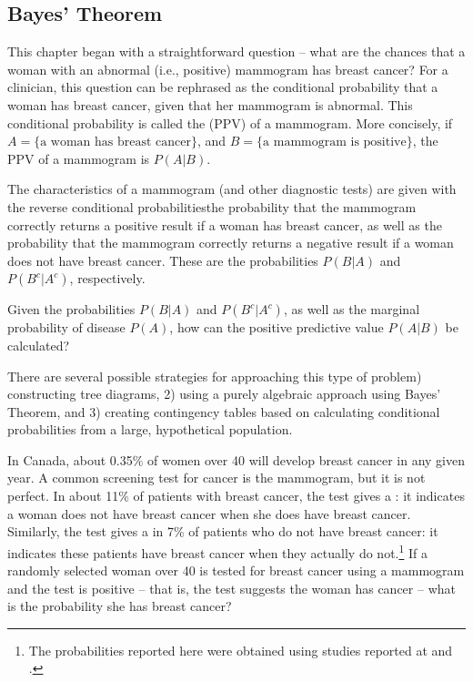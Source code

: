 \subsection{Bayes' Theorem}
\label{bayesTheoremSubsection}


This chapter began with a straightforward question -- what are the chances that a woman with an abnormal (i.e., positive) mammogram has breast cancer?  For a clinician, this question can be rephrased as the conditional probability  that a woman has breast cancer, given that her mammogram is abnormal. This conditional probability is called the  (PPV) of a mammogram. More concisely, if $A = \text{\{a woman has breast cancer\}}$, and $B = \text{\{a mammogram is  positive\}}$, the PPV of a mammogram is $P(A|B)$.

The characteristics of a mammogram (and other diagnostic tests) are given with the reverse conditional probabilities\textemdash  the probability that the mammogram correctly returns a positive result if a woman has breast cancer, as well as the probability that the mammogram correctly returns a negative result if a woman does not have breast cancer. These are the probabilities $P(B|A)$ and $P(B^c|A^c)$, respectively.

Given the probabilities $P(B|A)$ and $P(B^c|A^c)$, as well as the marginal probability of disease $P(A)$, how can the positive predictive value $P(A|B)$ be calculated?

There are several possible strategies for approaching this type of problem) constructing tree diagrams, 2) using a purely algebraic approach using Bayes' Theorem, and 3) creating contingency tables based on calculating conditional probabilities from a large, hypothetical population.

\begin{example}{In Canada, about 0.35\% of women over 40 will develop breast cancer in any given year. A common screening test for cancer is the mammogram, but it is not perfect. In about 11\% of patients with breast cancer, the test gives a : it indicates a woman does not have breast cancer when she does have breast cancer. Similarly, the test gives a  in 7\% of patients who do not have breast cancer: it indicates these patients have breast cancer when they actually do not.\footnote{The probabilities reported here were obtained using studies reported at  and .} If a randomly selected woman over 40 is tested for breast cancer using a mammogram and the test is positive -- that is, the test suggests the woman has cancer -- what is the probability she has breast cancer?}
\label{probabilityOfBreastCancerGivenPositiveTestExample}
\end{example}


